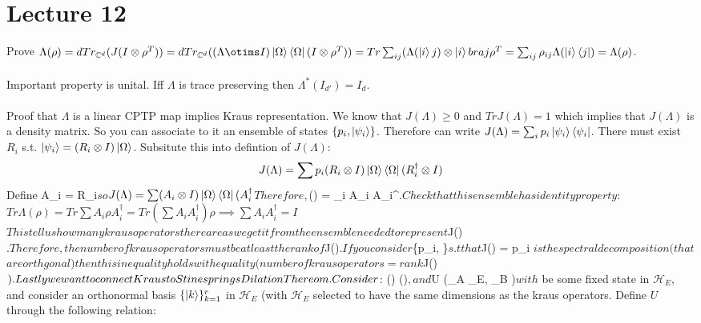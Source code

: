 \documentclass{article}
\begin{document}
\section{Lecture 12}
Prove $\Lambda(\rho) = dTr_{\mathbb{C}^d} (J(I \otimes \rho^T)) = d Tr_{\mathbb{C}^d}((\Lambda \otims I) \ket{\Omega} \bra{\Omega}(I \otimes \rho^T)) = Tr \sum_{ij}(\Lambda(\ket{i}{j}) \otimes \ket{i}bra{j}\rho^T = \sum_{ij} \rho_{ij} \Lambda(\ket{i}\bra{j}) = \Lambda(\rho)$.\\\\
Important property is unital. Iff $\Lambda$ is trace preserving then $\Lambda^*(I_{d'}) = I_d$.\\\\
Proof that $\Lambda$ is a linear CPTP map implies Kraus representation. We know that $J(\Lambda) \geq 0$ and $Tr J(\Lambda) = 1$ which implies that $J(\Lambda)$ is a density matrix. So you can associate to it an ensemble of states $\{p_i, \ket{\psi_i}\}$. Therefore can write $J(\Lambda) = \sum_i p_i \ket{\psi_i}\bra{\psi_i}$. There must exist $R_i$ s.t. $\ket{\psi_i} = (R_i \otimes I) \ket{\Omega}$. Subsitute this into defintion of $J(\Lambda)$:
$$
J(\Lambda) = \sum p_i (R_i \otimes I) \ket{\Omega}\bra{\Omega} (R_i^{\dagger} \otimes I)
$$
Define A_i =  R_i$ so
$$
J(\Lambda)= \sum (A_i \otimes I) \ket{\Omega} \bra{\Omega} (A^{\dagger}_i$$
Therefore, $\Lambda (\rho) = \sum_i A_i \rho A_i^{\dagger}$. Check that this ensemble has identity property:
$$
Tr \Lambda(\rho) = Tr \sum A_i \rho A_i^{\dagger} = Tr(\sum A_i A_i^{\dagger} )\rho \implies \sum A_i A_i^{\dagger} =I
$$
This tell us how many kraus operators there are as we get it from the ensemble needed to represent $J(\Lambda)$. Therefore, the number of kraus operators must be at least the rank of $J(\Lambda)$. If you consider $\{p_i, \}$ s.t that $J(\Lambda) = \sum p_i $ is the spectral decomposition (that $$ are orthgonal) then this inequality holds with equality (number of kraus operators = rank $J(\Lambda)$). \\\\
Lastly we want to connect Kraus to Stinesprings Dilation Thereom. Consider $\Lambda : () \rightarrow {}()$, and $U \in {}(_A \otimes {}_E, _B \otimes {})$ with $ be some fixed state in $\mathcal{H}_E$, and consider an orthonormal basis $\{\ket{k}\}_{k=1}^r$ in $\mathcal{H}_E$ (with $\mathcal{H}_E$ selected to have the same dimensions as the kraus operators. Define $U$ through the following relation:
\end{document}
